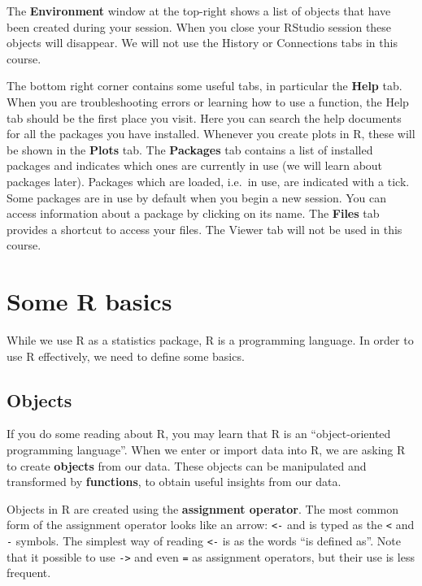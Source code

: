 \documentclass[
]{memoir}
\begin{document}
The \textbf{Environment} window at the top-right shows a list of objects that have been created during your session. When you close your RStudio session these objects will disappear. We will not use the History or Connections tabs in this course.

The bottom right corner contains some useful tabs, in particular the \textbf{Help} tab. When you are troubleshooting errors or learning how to use a function, the Help tab should be the first place you visit. Here you can search the help documents for all the packages you have installed. Whenever you create plots in R, these will be shown in the \textbf{Plots} tab. The \textbf{Packages} tab contains a list of installed packages and indicates which ones are currently in use (we will learn about packages later). Packages which are loaded, i.e.~in use, are indicated with a tick. Some packages are in use by default when you begin a new session. You can access information about a package by clicking on its name. The \textbf{Files} tab provides a shortcut to access your files. The Viewer tab will not be used in this course.

\hypertarget{some-r-basics}{%
\section{Some R basics}\label{some-r-basics}}

While we use R as a statistics package, R is a programming language. In order to use R effectively, we need to define some basics.

\hypertarget{objects}{%
\subsection{Objects}\label{objects}}

If you do some reading about R, you may learn that R is an ``object-oriented programming language''. When we enter or import data into R, we are asking R to create \textbf{objects} from our data. These objects can be manipulated and transformed by \textbf{functions}, to obtain useful insights from our data.

Objects in R are created using the \textbf{assignment operator}. The most common form of the assignment operator looks like an arrow: \texttt{\textless{}-} and is typed as the \texttt{\textless{}} and \texttt{-} symbols. The simplest way of reading \texttt{\textless{}-} is as the words ``is defined as''. Note that it possible to use \texttt{-\textgreater{}} and even \texttt{=} as assignment operators, but their use is less frequent.
\end{document}
